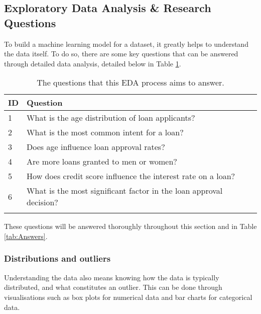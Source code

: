 \pagebreak

\subsection{Exploratory Data Analysis \& Research Questions}
To build a machine learning model for a dataset, it greatly helps to understand the data itself. To do so, 
there are some key questions that can be answered through detailed data analysis, detailed below in Table \ref{tab:Questions}.

\begin{longtable}{ | p{} | p{} | }
    \hline
    \cellcolor{blue!25} ID & \cellcolor{blue!25} Question \\
    \hline
    1 & What is the age distribution of loan applicants? \\
    \hline
    2 & What is the most common intent for a loan? \\
    \hline
    3 & Does age influence loan approval rates? \\
    \hline 
    4 & Are more loans granted to men or women? \\
    \hline 
    5 & How does credit score influence the interest rate on a loan? \\
    \hline 
    6 & What is the most significant factor in the loan approval decision? \\
    \hline
    \caption{The questions that this EDA process aims to answer.}\label{tab:Questions}
\end{longtable}

\para These questions will be answered thoroughly throughout this section and in 
Table \ref{tab:Answers}.


\subsubsection{Distributions and outliers}
Understanding the data also means knowing how the data is typically distributed, and what constitutes an outlier. This can be 
done through visualisations such as box plots for numerical data and bar charts for categorical data.

